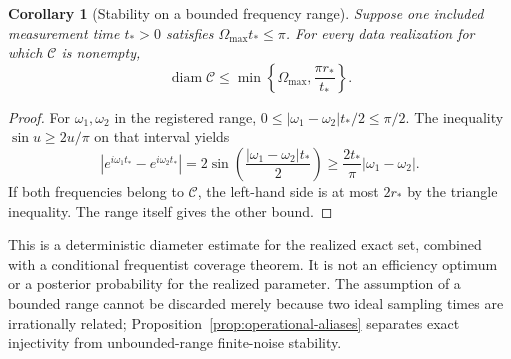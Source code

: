 \documentclass[11pt]{article}
\newtheorem{corollary}[theorem]{Corollary}
\theoremstyle{definition}
\begin{document}
\begin{corollary}[Stability on a bounded frequency range]
\label{cor:operational-diameter}
Suppose one included measurement time $t_*>0$ satisfies
$\Omega_{\max}t_*\le\pi$. For every data realization for which
$\mathcal C$ is nonempty,
\begin{equation}
 \operatorname{diam}\mathcal C
 \le\min\left\{\Omega_{\max},\frac{\pi r_*}{t_*}\right\}.
 \label{eq:operational-diameter}
\end{equation}
\end{corollary}
\begin{proof}
For $\omega_1,\omega_2$ in the registered range,
$0\le|\omega_1-\omega_2|t_*/2\le\pi/2$. The inequality
$\sin u\ge2u/\pi$ on that interval yields
\[
 |e^{i\omega_1t_*}-e^{i\omega_2t_*}|
 =2\sin\!\left(\frac{|\omega_1-\omega_2|t_*}{2}\right)
 \ge\frac{2t_*}{\pi}|\omega_1-\omega_2|.
\]
If both frequencies belong to $\mathcal C$, the left-hand side is at most
$2r_*$ by the triangle inequality. The range itself gives the other bound.
\end{proof}

This is a deterministic diameter estimate for the realized exact set, combined
with a conditional frequentist coverage theorem. It is not an efficiency
optimum or a posterior probability for the realized parameter. The assumption
of a bounded range cannot be discarded merely because two ideal sampling
times are irrationally related; Proposition~\ref{prop:operational-aliases}
separates exact injectivity from unbounded-range finite-noise stability.
\end{document}
